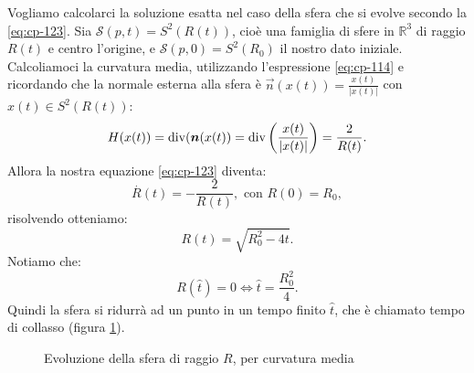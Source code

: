 \begin{esempio}
Vogliamo calcolarci la soluzione esatta nel caso della sfera che si evolve secondo la \eqref{eq:cp-123}. Sia $\mathcal{S}(p,t) = S^2(R(t))$, cioè una famiglia di sfere in $\mathbb{R}^3$ di raggio $R(t)$ e centro l'origine, e $\mathcal{S}(p,0) = S^2(R_0)$ il nostro dato iniziale. Calcoliamoci la curvatura media, utilizzando l'espressione \eqref{eq:cp-114} e ricordando che la normale esterna alla sfera è $\vec{n}(x(t))=\frac{x(t)}{|x(t)|}$ con $x(t)\in S^2(R(t))$:
\[
H(x(t)) = \operatorname{div}(\bm{n}(x(t))=\operatorname{div}\left(\frac{x(t)}{|x(t)|}\right)=\frac{2}{R(t)}.   
\]
Allora la nostra equazione \eqref{eq:cp-123} diventa:
\[
\overset{.}{R}(t)=-\frac{2}{R(t)}, \text{ con } R(0) = R_0,
\]
risolvendo otteniamo:
\[
R(t)=\sqrt{R_0^2-4t}.
\]
Notiamo che:
\[
R(\hat{t})=0 \Longleftrightarrow \hat{t}=\frac{R_0^2}{4}.
\]
Quindi la sfera si ridurrà ad un punto in un tempo finito $\hat{t}$, che è chiamato tempo di collasso (figura \ref{fig:cp-121}).

\begin{figure}[!hp]
  \begin{center}
  \end{center}
  \caption{Evoluzione della sfera di raggio $R$, per curvatura media}
  \label{fig:cp-121}
\end{figure}
\end{esempio}

